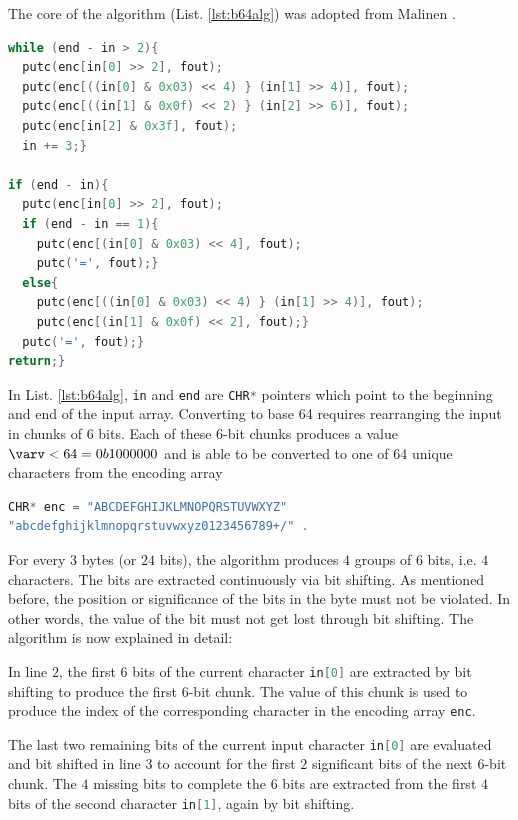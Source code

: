 \bigbreak
The core of the algorithm (List. \ref{lst:b64alg}) was adopted from Malinen \cite{Mal05}.

\begin{lstlisting}[language=C, caption=b64 algorithm ,label=lst:b64alg]
while (end - in > 2){
  putc(enc[in[0] >> 2], fout);
  putc(enc[((in[0] & 0x03) << 4) } (in[1] >> 4)], fout);
  putc(enc[((in[1] & 0x0f) << 2) } (in[2] >> 6)], fout);
  putc(enc[in[2] & 0x3f], fout);
  in += 3;}
  
if (end - in){
  putc(enc[in[0] >> 2], fout);
  if (end - in == 1){
    putc(enc[(in[0] & 0x03) << 4], fout);
    putc('=', fout);}
  else{
    putc(enc[((in[0] & 0x03) << 4) } (in[1] >> 4)], fout);
    putc(enc[(in[1] & 0x0f) << 2], fout);}
  putc('=', fout);}
return;}
\end{lstlisting}

In List. \ref{lst:b64alg}, \lstinline[language=C]{in} and \lstinline[language=C]{end} are \lstinline[language=C]{CHR*} pointers which point to the beginning and end of the input array. Converting to base 64 requires rearranging the input in chunks of 6 bits. Each of these 6-bit chunks produces a value $\varv < 64 = 0b1000000$ and is able to be converted to one of 64 unique characters from the encoding array

\begin{lstlisting}[language=C, frame=none, numbers=none,breaklines=true]
CHR* enc = "ABCDEFGHIJKLMNOPQRSTUVWXYZ"
"abcdefghijklmnopqrstuvwxyz0123456789+/" .
\end{lstlisting}

\bigbreak
For every $3$ bytes (or $24$ bits), the algorithm produces $4$ groups of $6$ bits, i.e. $4$ characters. The bits are extracted continuously via bit shifting. As mentioned before, the position or significance of the bits in the byte must not be violated. In other words, the value of the bit must not get lost through bit shifting. The algorithm is now explained in detail: 

\bigbreak
In line $2$, the first $6$ bits of the current character \lstinline[language=C]{in[0]} are extracted by bit shifting to produce the first $6$-bit chunk. The value of this chunk is used to produce the index of the corresponding character in the encoding array \lstinline[language=C]{enc}. 

\bigbreak
The last two remaining bits of the current input character \lstinline[language=C]{in[0]} are evaluated and bit shifted in line $3$ to account for the first $2$ significant bits of the next $6$-bit chunk. The $4$ missing bits to complete the $6$ bits are extracted from the first $4$ bits of the second character \lstinline[language=C]{in[1]}, again by bit shifting.    

